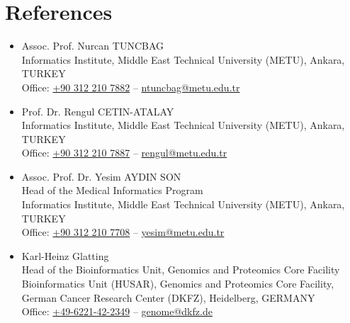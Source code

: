 \documentclass[a4paper,12pt]{article}
\newcommand{\resumeItemNoTitle}[1]{
  \item\small{
    {#1\vspace{-2pt}}
  }
}
\newcommand{\resumeSubItemSingle}[1]{\resumeItemNoTitle{#1}\vspace{-4pt}}
\newcommand{\resumeSubHeadingListStart}{\begin{itemize}[leftmargin=*]}
\newcommand{\resumeSubHeadingListEnd}{\end{itemize}}
\begin{document}
\section{References}
  \resumeSubHeadingListStart
    \resumeSubItemSingle{Assoc. Prof. Nurcan TUNCBAG
      \\Informatics Institute, Middle East Technical University (METU), Ankara, TURKEY
      \\Office: \href{tel:+903122107882}{+90 312 210 7882} -- \href{mailto:ntuncbag@metu.edu.tr}{ntuncbag@metu.edu.tr}}
    \resumeSubItemSingle{Prof. Dr. Rengul CETIN-ATALAY
      \\Informatics Institute, Middle East Technical University (METU), Ankara, TURKEY
      \\Office: \href{tel:+903122107887}{+90 312 210 7887} -- \href{mailto:rengul@metu.edu.tr}{rengul@metu.edu.tr}}
    \resumeSubItemSingle{Assoc. Prof. Dr. Yesim AYDIN SON
      \\Head of the Medical Informatics Program
      \\Informatics Institute, Middle East Technical University (METU), Ankara, TURKEY
      \\Office: \href{tel:+903122107708}{+90 312 210 7708} -- \href{mailto:yesim@metu.edu.tr}{yesim@metu.edu.tr}}
    \resumeSubItemSingle{Karl-Heinz Glatting
      \\Head of the Bioinformatics Unit, Genomics and Proteomics Core Facility
      \\Bioinformatics Unit (HUSAR), Genomics and Proteomics Core Facility, German Cancer Research Center (DKFZ), Heidelberg, GERMANY
      \\Office: \href{tel:+49-6221-42-2349}{+49-6221-42-2349} -- \href{mailto:genome@dkfz.de}{genome@dkfz.de}}
  \resumeSubHeadingListEnd

\end{document}
